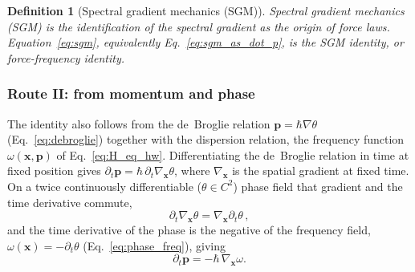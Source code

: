\documentclass[aps,prd,onecolumn,tightenlines,nofootinbib,notitlepage,11pt,floatfix]{revtex4-2}
\theoremstyle{indentedtheorem}
\newtheorem{definition}{Definition}
\begin{document}
\begin{definition}[Spectral gradient mechanics (SGM)]\label{def:sgm_def}
Spectral gradient mechanics (SGM) is the identification of the spectral gradient as the origin of force laws. Equation~\eqref{eq:sgm}, equivalently Eq.~\eqref{eq:sgm_as_dot_p}, is the \emph{SGM identity}, or force-frequency identity.
\end{definition}

\subsubsection{Route II: from momentum and phase}
\label{sec:route_phase}

The identity also follows from the de~Broglie relation $\mathbf{p}=\hbar\nabla\theta$ (Eq.~\eqref{eq:debroglie}) together with the dispersion relation, the frequency function $\omega(\mathbf{x},\mathbf{p})$ of Eq.~\eqref{eq:H_eq_hw}. Differentiating the de~Broglie relation in time at fixed position gives $\partial_t\mathbf{p}=\hbar\,\partial_t\nabla_{\mathbf{x}}\theta$, where $\nabla_{\mathbf{x}}$ is the spatial gradient at fixed time. On a twice continuously differentiable ($\theta\in C^2$) phase field that gradient and the time derivative commute,
\begin{equation}
    \partial_t\nabla_{\mathbf{x}}\theta = \nabla_{\mathbf{x}}\partial_t\theta \, ,
    \label{eq:mixed_orders}
\end{equation}
and the time derivative of the phase is the negative of the frequency field, $\omega(\mathbf{x})=-\partial_t\theta$ (Eq.~\eqref{eq:phase_freq}), giving
\begin{equation}
    \partial_t\mathbf{p} = -\hbar\,\nabla_{\mathbf{x}}\omega .
    \label{eq:dp_dt_local}
\end{equation}
\end{document}
